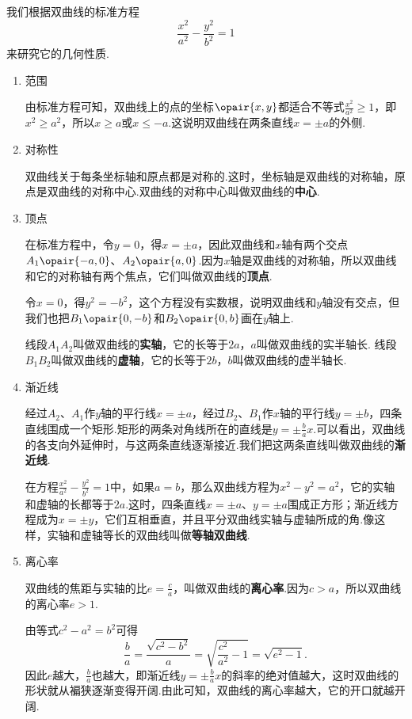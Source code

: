 我们根据双曲线的标准方程\[
\frac{x^2}{a^2} - \frac{y^2}{b^2} = 1
\]来研究它的几何性质.
\begin{enumerate}
\item 范围

由标准方程可知，双曲线上的点的坐标\(\opair{x,y}\)都适合不等式\(\frac{x^2}{a^2}\geqslant1\)，即\(x^2 \geqslant a^2\)，所以\(x \geqslant a\)或\(x \leqslant -a\).这说明双曲线在两条直线\(x = \pm a\)的外侧.

\item 对称性

双曲线关于每条坐标轴和原点都是对称的.这时，坐标轴是双曲线的对称轴，原点是双曲线的对称中心.双曲线的对称中心叫做双曲线的\textbf{中心}.

\item 顶点

在标准方程中，令\(y=0\)，得\(x = \pm a\)，因此双曲线和\(x\)轴有两个交点\(A_1\opair{-a,0}\)、\(A_2\opair{a,0}\).因为\(x\)轴是双曲线的对称轴，所以双曲线和它的对称轴有两个焦点，它们叫做双曲线的\textbf{顶点}.

令\(x=0\)，得\(y^2=-b^2\)，这个方程没有实数根，说明双曲线和\(y\)轴没有交点，但我们也把\(B_1\opair{0,-b}\)和\(B_2\opair{0,b}\)画在\(y\)轴上.

线段\(A_1 A_2\)叫做双曲线的\textbf{实轴}，它的长等于\(2a\)，\(a\)叫做双曲线的实半轴长.
线段\(B_1 B_2\)叫做双曲线的\textbf{虚轴}，它的长等于\(2b\)，\(b\)叫做双曲线的虚半轴长.

\item 渐近线

经过\(A_2\)、\(A_1\)作\(y\)轴的平行线\(x = \pm a\)，经过\(B_2\)、\(B_1\)作\(x\)轴的平行线\(y = \pm b\)，四条直线围成一个矩形.矩形的两条对角线所在的直线是\(y = \pm\frac{b}{a}x\).可以看出，双曲线的各支向外延伸时，与这两条直线逐渐接近.我们把这两条直线叫做双曲线的\textbf{渐近线}.

在方程\(\frac{x^2}{a^2}-\frac{y^2}{b^2}=1\)中，如果\(a=b\)，那么双曲线方程为\(x^2-y^2=a^2\)，它的实轴和虚轴的长都等于\(2a\).这时，四条直线\(x=\pm a\)、\(y=\pm a\)围成正方形；渐近线方程成为\(x=\pm y\)，它们互相垂直，并且平分双曲线实轴与虚轴所成的角.像这样，实轴和虚轴等长的双曲线叫做\textbf{等轴双曲线}.

\item 离心率

双曲线的焦距与实轴的比\(e = \frac{c}{a}\)，叫做双曲线的\textbf{离心率}.因为\(c > a\)，所以双曲线的离心率\(e > 1\).

由等式\(c^2-a^2=b^2\)可得\[
\frac{b}{a} = \frac{\sqrt{c^2-b^2}}{a} = \sqrt{\frac{c^2}{a^2}-1} = \sqrt{e^2-1}.
\]因此\(e\)越大，\(\frac{b}{a}\)也越大，即渐近线\(y = \pm\frac{b}{a}x\)的斜率的绝对值越大，这时双曲线的形状就从褊狭逐渐变得开阔.由此可知，双曲线的离心率越大，它的开口就越开阔.
\end{enumerate}

